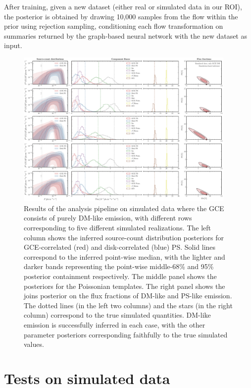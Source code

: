 \documentclass[prd,aps,10pt,nofootinbib,twocolumn,superscriptaddress,preprintnumbers,balancelastpage,longbibliography]{revtex4-1}
\begin{document}
After training, given a new dataset (either real or simulated \Fermi data in our ROI), the posterior is obtained by drawing 10,000 samples from the flow within the prior using rejection sampling, conditioning each flow transformation on summaries returned by the graph-based neural network with the new dataset as input.

%
\begin{figure}
    \centering
    \includegraphics[width=0.95\textwidth]{plots/sim_sbi_dm.pdf}
    \caption{Results of the analysis pipeline on simulated \Fermi data where the GCE consists of purely DM-like emission, with different rows corresponding to five different simulated realizations. The left column shows the inferred source-count distribution posteriors for GCE-correlated (red) and disk-correlated (blue) PS. Solid lines correspond to the inferred point-wise median, with the lighter and darker bands representing the point-wise middle-68\% and 95\% posterior containment respectively. The middle panel shows the posteriors for the Poissonian templates. The right panel shows the joins posterior on the flux fractions of DM-like and PS-like emission. The dotted lines (in the left two columns) and the stars (in the right column) correspond to the true simulated quantities. DM-like emission is successfully inferred in each case, with the other parameter posteriors corresponding faithfully to the true simulated values.} 
    \label{fig:sim_sbi_dm}
\end{figure}
%

\section{Tests on simulated data}
\label{sec:simulations}
\end{document}
